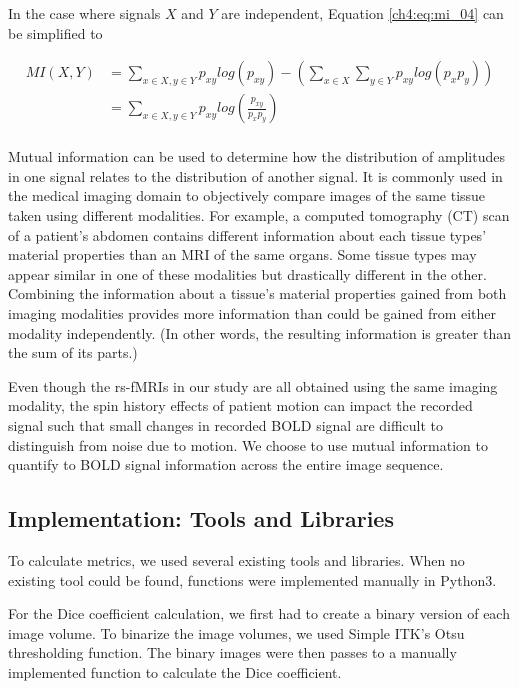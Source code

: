 \noindent In the case where signals $X$ and $Y$ are independent, Equation \ref{ch4:eq:mi_04} can be simplified to

\begin{equation}
\label{ch4:eq:mi_05}
\begin{split}
MI(X, Y) & = \sum_{x \in X, y \in Y} p_{xy} log (p_{xy}) - \left( \sum_{x \in X} \sum_{y \in Y} p_{xy} log(p_x p_y) \right) \\
 & = \sum_{x \in X, y \in Y} p_{xy} log \left( \frac{p_{xy}}{p_x p_y} \right) \\
\end{split}
\end{equation} 

Mutual information can be used to determine how the distribution of amplitudes in one signal relates to the distribution of another signal. It is commonly used in the medical imaging domain to objectively compare images of the same tissue taken using different modalities. For example, a computed tomography (CT) scan of a patient's abdomen contains different information about each tissue types' material properties than an MRI of the same organs. Some tissue types may appear similar in one of these modalities but drastically different in the other. Combining the information about a tissue's material properties gained from both imaging modalities provides more information than could be gained from either modality independently. (In other words, the resulting information is greater than the sum of its parts.)

Even though the rs-fMRIs in our study are all obtained using the same imaging modality, the spin history effects of patient motion can impact the recorded signal such that small changes in recorded BOLD signal are difficult to distinguish from noise due to motion. We choose to use mutual information to quantify to BOLD signal information across the entire image sequence.

\subsection{Implementation: Tools and Libraries}

To calculate metrics, we used several existing tools and libraries. When no existing tool could be found, functions were implemented manually in Python3. 

For the Dice coefficient calculation, we first had to create a binary version of each image volume. To binarize the image volumes, we used Simple ITK's Otsu thresholding function. The binary images were then passes to a manually implemented function to calculate the Dice coefficient.

